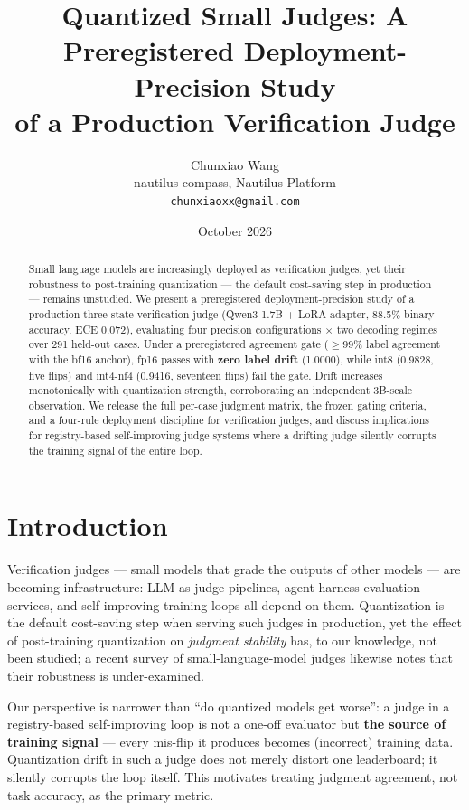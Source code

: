 \documentclass[11pt]{article}
\title{Quantized Small Judges: A Preregistered Deployment-Precision Study\\ of a Production Verification Judge}
\author{Chunxiao Wang\\
        nautilus-compass, Nautilus Platform\\
        \texttt{chunxiaoxx@gmail.com}}
\date{October 2026}
\begin{document}
\maketitle

\begin{abstract}
Small language models are increasingly deployed as verification judges, yet their
robustness to post-training quantization --- the default cost-saving step in
production --- remains unstudied. We present a preregistered deployment-precision
study of a production three-state verification judge (Qwen3-1.7B + LoRA adapter,
88.5\% binary accuracy, ECE 0.072), evaluating four precision configurations
$\times$ two decoding regimes over 291 held-out cases. Under a preregistered
agreement gate ($\geq$99\% label agreement with the bf16 anchor), fp16 passes with
\textbf{zero label drift} (1.0000), while int8 (0.9828, five flips) and int4-nf4
(0.9416, seventeen flips) fail the gate. Drift increases monotonically with
quantization strength, corroborating an independent 3B-scale observation. We
release the full per-case judgment matrix, the frozen gating criteria, and a
four-rule deployment discipline for verification judges, and discuss implications
for registry-based self-improving judge systems where a drifting judge silently
corrupts the training signal of the entire loop.
\end{abstract}

\section{Introduction}
Verification judges --- small models that grade the outputs of other models ---
are becoming infrastructure: LLM-as-judge pipelines, agent-harness evaluation
services, and self-improving training loops all depend on them. Quantization is
the default cost-saving step when serving such judges in production, yet the
effect of post-training quantization on \emph{judgment stability} has, to our
knowledge, not been studied; a recent survey of small-language-model judges
likewise notes that their robustness is under-examined.

Our perspective is narrower than ``do quantized models get worse'': a judge in a
registry-based self-improving loop is not a one-off evaluator but \textbf{the
source of training signal} --- every mis-flip it produces becomes (incorrect)
training data. Quantization drift in such a judge does not merely distort one
leaderboard; it silently corrupts the loop itself. This motivates treating
judgment agreement, not task accuracy, as the primary metric.
\end{document}
